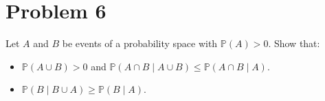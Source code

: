 \section{Problem 6}\label{hw01-problem-6}

Let \(\mathit{A}\) and \(\mathit{B}\) be events of a probability space with \(\mathbb{P}(\mathit{A}) > 0\). Show that:

\begin{itemize}
\item
  \(\mathbb{P}(\mathit{A} \cup \mathit{B}) > 0\) and \(\mathbb{P}(\mathit{A} \cap \mathit{B} \mid \mathit{A} \cup \mathit{B}) \leq \mathbb{P}(\mathit{A} \cap \mathit{B} \mid \mathit{A})\).
\item
  \(\mathbb{P}(\mathit{B} \mid \mathit{B} \cup \mathit{A}) \geq \mathbb{P}(\mathit{B} \mid \mathit{A})\).
\end{itemize}

